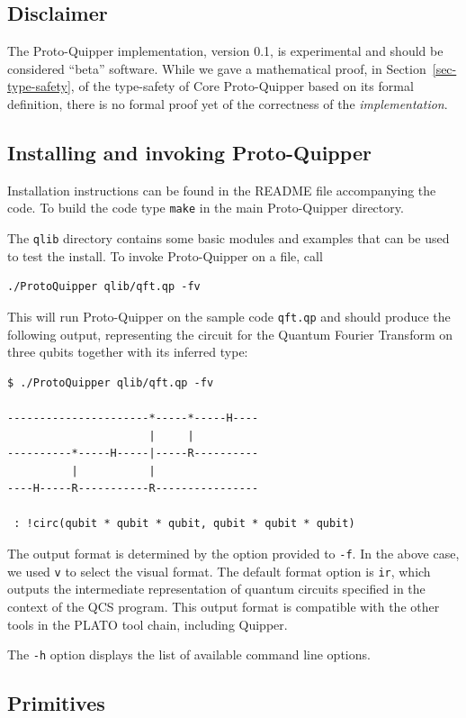 \subsection{Disclaimer}

The Proto-Quipper implementation, version 0.1, is experimental and
should be considered ``beta'' software. While we gave a mathematical
proof, in Section~\ref{sec-type-safety}, of the type-safety of Core
Proto-Quipper based on its formal definition, there is no formal proof
yet of the correctness of the {\em implementation}.

\subsection{Installing and invoking Proto-Quipper}

Installation instructions can be found in the README file accompanying the code. 
To build the code type \verb#make# in the main Proto-Quipper directory. 

The \verb#qlib# directory contains some basic modules and examples that can 
be used to test the install. To invoke Proto-Quipper on a file, call 
\begin{verbatim}
./ProtoQuipper qlib/qft.qp -fv
\end{verbatim}
This will run Proto-Quipper on the sample code \verb#qft.qp# and should produce the following output, representing the circuit for the 
Quantum Fourier Transform on three qubits together with its inferred 
type:
\begin{verbatim}
$ ./ProtoQuipper qlib/qft.qp -fv

----------------------*-----*-----H----
                      |     |          
----------*-----H-----|-----R----------
          |           |                
----H-----R-----------R----------------

 : !circ(qubit * qubit * qubit, qubit * qubit * qubit)
\end{verbatim}
The output format is determined by the option provided to \verb#-f#. In the above case, we used \verb#v# to select the visual format. The default format option is \verb#ir#, which outputs the intermediate representation of quantum circuits specified in the context of the QCS program. This output format is compatible with the other tools in the PLATO tool chain, including Quipper.

The \verb#-h# option displays the list of available command line options. 

\subsection{Primitives}

